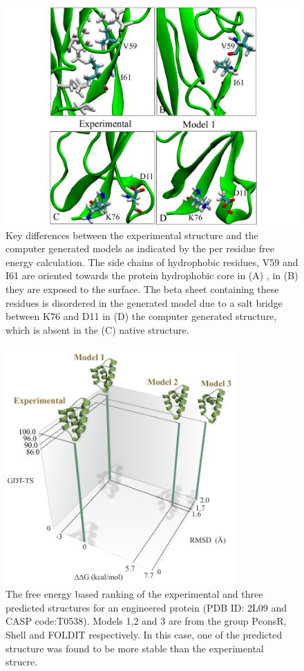 \documentclass[12pt]{article}
\begin{document}
\begin{figure}
\begin{center}
\includegraphics[width=5 in,height=4 in]{T0569_perres2.pdf}
\end{center}
\caption{Key differences between the experimental structure and the computer generated models as
    indicated by the per residue free energy calculation.
The side chains of hydrophobic residues, V59 and I61 are oriented towards the protein hydrophobic core in (A)  
, in (B) they are exposed to the surface. The beta sheet containing these residues is disordered in
the generated model due to
a salt bridge between K76 and D11 in (D) the computer generated structure, which is absent in the (C) native structure.}
\label{fig:T0569_per_residue}
\end{figure}

\begin{figure}
\begin{center}
\includegraphics[width=3.5in]{T0538.pdf}
\end{center}
\caption{The free energy based ranking of the experimental and three predicted structures for an engineered protein (PDB ID: 2L09 and CASP
    code:T0538). Models 1,2 and 3 are from the group PconsR, Shell and FOLDIT respectively. In this case, one of the predicted structure 
    was found to be more stable than the experimental strucre.}
\label{fig:T0538}
\end{figure}
\end{document}
